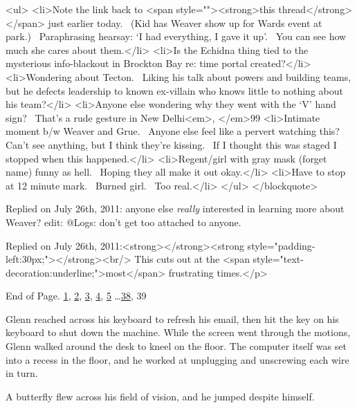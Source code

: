 <ul>
<li>Note the link back to <span style=""><strong>this thread</strong></span> just earlier today.  (Kid has Weaver show up for Wards event at park.)  Paraphrasing hearsay: ‘I had everything, I gave it up’.  You can see how much she cares about them.</li>
<li>Is the Echidna thing tied to the mysterious info-blackout in Brockton Bay re: time portal created?</li>
<li>Wondering about Tecton.  Liking his talk about powers and building teams, but he defects leadership to known ex-villain who knows little to nothing about his team?</li>
<li>Anyone else wondering why they went with the ‘V’ hand sign?  That’s a rude gesture in New Delhi<em>, </em>99%
<li>Intimate moment b/w Weaver and Grue.  Anyone else feel like a pervert watching this?  Can’t see anything, but I think they’re kissing.  If I thought this was staged I stopped when this happened.</li>
<li>Regent/girl with gray mask (forget name) funny as hell.  Hoping they all make it out okay.</li>
<li>Have to stop at 12 minute mark.  Burned girl.  Too real.</li>
</ul>
</blockquote>



\blacktriangleright {}
Replied on July 26th, 2011:
anyone else \emph{really} interested in learning more about Weaver?
edit:  @Logs: don't get too attached to anyone.



Replied on July 26th, 2011:<strong></strong><strong style="padding-left:30px;"></strong><br/>
This cuts out at the <span style="text-decoration:underline;">most</span> frustrating times.</p>



End of Page.   \underline{1}, \underline{2}, \underline{3}, \underline{4}, \underline{5} \ldots \underline{38}, 39



\sectionbreak



Glenn reached across his keyboard to refresh his email, then hit the key on his keyboard to shut down the machine.  While the screen went through the motions, Glenn walked around the desk to kneel on the floor.  The computer itself was set into a recess in the floor, and he worked at unplugging and unscrewing each wire in turn.



A butterfly flew across his field of vision, and he jumped despite himself.




